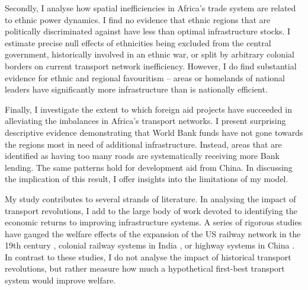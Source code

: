 \documentclass[11pt, oneside]{article}   	%
\begin{document}
Secondly, I analyse how spatial inefficiencies in Africa's trade system are related to ethnic power dynamics. I find no evidence that ethnic regions that are politically discriminated against have less than optimal infrastructure stocks. I estimate precise null effects of ethnicities being excluded from the central government, historically involved in an ethnic war, or split by arbitrary colonial borders \citep{Michalopoulos_LongRunEffectsScramble_2016} on current transport network inefficiency. However, I do find substantial evidence for ethnic and regional favouritism -- areas or homelands of national leaders have significantly more infrastructure than is nationally efficient.

Finally, I investigate the extent to which foreign aid projects have succeeded in alleviating the imbalances in Africa's transport networks. I present surprising descriptive evidence demonstrating that World Bank funds have not gone towards the regions most in need of additional infrastructure. Instead, areas that are identified as having too many roads are systematically receiving more Bank lending. The same patterns hold for development aid from China. In discussing the implication of this result, I offer insights into the limitations of my model.

My study contributes to several strands of literature. In analysing the impact of transport revolutions, I add to the large body of work devoted to identifying the economic returns to improving infrastructure systems. A series of rigorous studies have gauged the welfare effects of the expansion of the US railway network in the 19th century \citep{donaldson_railroads_2016,Swisher_ReassessingRailroadsGrowth_2017}, colonial railway systems in India \citep{Donaldson_RailroadsRajEstimating_2018,Burgess_RailroadsDemiseFamine_2012}, or highway systems in China \citep{Faber_TradeIntegrationMarket_2014,Baum-Snow_RoadsRailroadsDecentralization_2017}. In contrast to these studies, I do not analyse the impact of historical transport revolutions, but rather measure how much a hypothetical first-best transport system would improve welfare.
\end{document}
